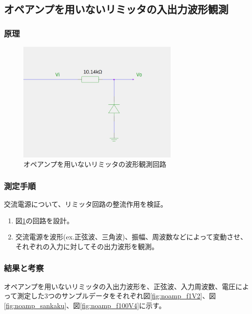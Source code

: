 \documentclass[11pt,a4j]{jsarticle}
\begin{document}
  \subsection{オペアンプを用いないリミッタの入出力波形観測}
   \subsubsection{原理}
    
    \begin{figure}[htbp]
  \centering
  \includegraphics[width=8cm,clip]{noamp_wave.png}
  \caption{オペアンプを用いないリミッタの波形観測回路}
  \label{fig:noamp_wave}
 \end{figure}%
    
   \subsubsection{測定手順}
    交流電源について、リミッタ回路の整流作用を検証。
    \begin{enumerate}
    \item 図\ref{fig:noamp_wave}の回路を設計。
    \item 交流電源を波形(ex.正弦波、三角波)、振幅、周波数などによって変動させ、それぞれの入力に対してその出力波形を観測。
    \end{enumerate}
    
   \subsubsection{結果と考察}
    
    オペアンプを用いないリミッタの入出力波形を、正弦波、入力周波数、電圧によって測定した3つのサンプルデータをそれぞれ図\ref{fig:noamp_f1V2}、図\ref{fig:noamp_sankaku}、図\ref{fig:noamp_f100V4}に示す。
    
\end{document}
